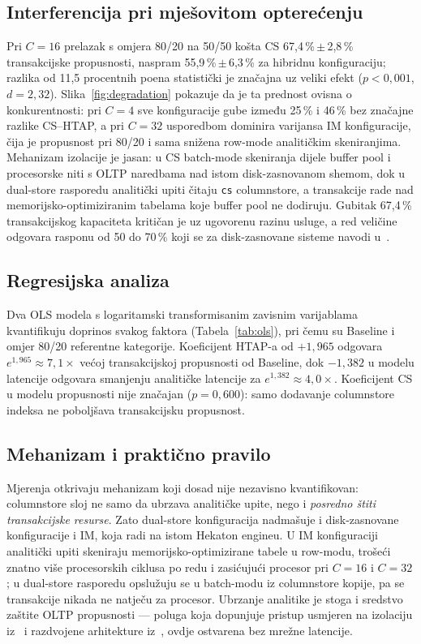 \documentclass[10pt,conference,a4paper]{IEEEtran}
\begin{document}
\subsection{Interferencija pri mješovitom opterećenju}
Pri $C = 16$ prelazak s omjera 80/20 na 50/50 košta CS
67,4\,\%\,$\pm$\,2,8\,\% transakcijske propusnosti, naspram
55,9\,\%\,$\pm$\,6,3\,\% za hibridnu konfiguraciju; razlika od 11,5
procentnih poena statistički je značajna uz veliki efekt
($p < 0{,}001$, $d = 2{,}32$). Slika~\ref{fig:degradation} pokazuje da je ta
prednost ovisna o konkurentnosti: pri $C = 4$ sve konfiguracije gube između
25\,\% i 46\,\% bez značajne razlike CS--HTAP, a pri $C = 32$ usporedbom
dominira varijansa IM konfiguracije, čija je propusnost pri 80/20 i sama
snižena row-mode analitičkim skeniranjima. Mehanizam izolacije je jasan: u CS
batch-mode skeniranja dijele buffer pool i procesorske niti s OLTP naredbama
nad istom disk-zasnovanom shemom, dok u dual-store rasporedu analitički
upiti čitaju \texttt{cs} columnstore, a transakcije rade nad
memorijsko-optimiziranim tabelama koje buffer pool ne dodiruju.
Gubitak 67,4\,\% transakcijskog kapaciteta kritičan je uz ugovorenu razinu
usluge, a red veličine odgovara rasponu od 50 do 70\,\% koji se za
disk-zasnovane sisteme navodi u~\cite{wu2025}.

\subsection{Regresijska analiza}
Dva OLS modela s logaritamski transformisanim zavisnim varijablama
kvantifikuju doprinos svakog faktora (Tabela~\ref{tab:ols}), pri čemu su
Baseline i omjer 80/20 referentne kategorije. Koeficijent HTAP-a od
$+1{,}965$ odgovara $e^{1{,}965} \approx 7{,}1\times$ većoj transakcijskoj
propusnosti od Baseline, dok $-1{,}382$ u modelu latencije odgovara
smanjenju analitičke latencije za $e^{1{,}382} \approx 4{,}0\times$.
Koeficijent CS u modelu propusnosti nije značajan ($p = 0{,}600$): samo
dodavanje columnstore indeksa ne poboljšava transakcijsku propusnost.

\subsection{Mehanizam i praktično pravilo}
Mjerenja otkrivaju mehanizam koji dosad nije nezavisno kvantifikovan:
columnstore sloj ne samo da ubrzava analitičke upite, nego i \emph{posredno
štiti transakcijske resurse}. Zato dual-store konfiguracija nadmašuje i disk-zasnovane konfiguracije i IM,
koja radi na istom Hekaton engineu. U IM konfiguraciji analitički upiti skeniraju
memorijsko-optimizirane tabele u row-modu, trošeći znatno više procesorskih
ciklusa po redu i zasićujući procesor pri $C = 16$ i $C = 32$; u dual-store
rasporedu opslužuju se u batch-modu iz columnstore kopije, pa se transakcije
nikada ne natječu za procesor. Ubrzanje analitike je stoga i
sredstvo zaštite OLTP propusnosti --- poluga koja dopunjuje pristup
usmjeren na izolaciju iz~\cite{kang2023} i razdvojene arhitekture
iz~\cite{huang2020, yang2020}, ovdje ostvarena bez mrežne latencije.
\end{document}
